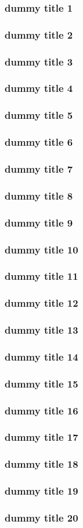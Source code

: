 \begin{frame} \frametitle{dummy title 1} \end{frame}
\begin{frame} \frametitle{dummy title 2} \end{frame}
\begin{frame} \frametitle{dummy title 3} \end{frame}
\begin{frame} \frametitle{dummy title 4} \end{frame}
\begin{frame} \frametitle{dummy title 5} \end{frame}
\begin{frame} \frametitle{dummy title 6} \end{frame}
\begin{frame} \frametitle{dummy title 7} \end{frame}
\begin{frame} \frametitle{dummy title 8} \end{frame}
\begin{frame} \frametitle{dummy title 9} \end{frame}
\begin{frame} \frametitle{dummy title 10} \end{frame}
\begin{frame} \frametitle{dummy title 11} \end{frame}
\begin{frame} \frametitle{dummy title 12} \end{frame}
\begin{frame} \frametitle{dummy title 13} \end{frame}
\begin{frame} \frametitle{dummy title 14} \end{frame}
\begin{frame} \frametitle{dummy title 15} \end{frame}
\begin{frame} \frametitle{dummy title 16} \end{frame}
\begin{frame} \frametitle{dummy title 17} \end{frame}
\begin{frame} \frametitle{dummy title 18} \end{frame}
\begin{frame} \frametitle{dummy title 19} \end{frame}
\begin{frame} \frametitle{dummy title 20} \end{frame}

